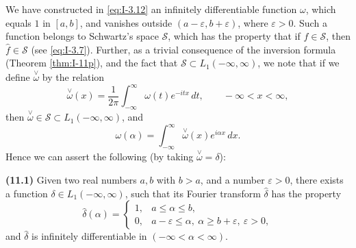We have constructed in \eqref{eq:I-3.12} an infinitely differentiable function $\omega$, which equals $1$ in $[a,b]$, and vanishes outside $(a-\varepsilon,b+\varepsilon)$, where $\varepsilon>0$. Such a function belongs to Schwartz's space $\mathcal S$, which has the property that if $f\in\mathcal S$, then $\widehat f\in\mathcal S$ (see \eqref{eq:I-3.7}). Further, as a trivial consequence of the inversion formula (Theorem \ref{thm:I-11p}), and the fact that $\mathcal S\subset L_1(-\infty,\infty)$, we note that if we define $\overset{\vee}{\omega}$ by the relation
\begin{equation*}
\overset{\vee}{\omega}(x)=\frac{1}{2\pi}\int_{-\infty}^{\infty}\omega(t)e^{-itx}\,dt,\qquad-\infty<x<\infty,
\end{equation*}
then $\overset{\vee}{\omega}\in\mathcal S\subset L_1(-\infty,\infty)$, and
\begin{equation*}
\omega(\alpha)=\int_{-\infty}^{\infty}\overset{\vee}{\omega}(x)e^{i\alpha x}\,dx.
\end{equation*}
Hence we can assert the following (by taking $\overset{\vee}{\omega}=\delta$):

\noindent\textbf{(11.1)} Given two real numbers $a,b$ with $b>a$, and a number $\varepsilon>0$, there exists a function $\delta\in L_1(-\infty,\infty)$, such that its Fourier transform $\widehat\delta$ has the property
\begin{equation}\label{eq:I-11.1}\tag{11.1}
\widehat\delta(\alpha)=
\begin{cases}
1,&a\le\alpha\le b,\\
0,&a-\varepsilon\le\alpha,\ \alpha\ge b+\varepsilon,\ \varepsilon>0,
\end{cases}
\end{equation}
and $\widehat\delta$ is infinitely differentiable in $(-\infty<\alpha<\infty)$.

